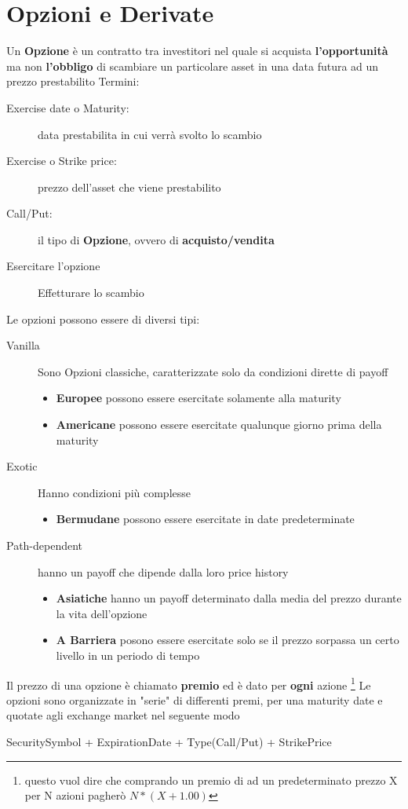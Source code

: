 \documentclass[a4paper,11pt]{report}
\begin{document}
{\section{Opzioni e Derivate}
	Un \textbf{Opzione} è un contratto tra investitori nel quale si acquista \textbf{l'opportunità} ma non \textbf{l'obbligo} 
	di scambiare un particolare asset in una data futura ad un prezzo prestabilito \newline
	Termini: 
\begin{description}
	\item[Exercise date o Maturity:] data prestabilita in cui verrà svolto lo scambio 
	\item[Exercise o Strike price:] prezzo dell'asset che viene prestabilito
	\item[Call/Put:] il tipo di \textbf{Opzione}, ovvero di \textbf{acquisto/vendita}
	\item[Esercitare l'opzione] Effetturare lo scambio
\end{description} 
	Le opzioni possono essere di diversi tipi:
\begin{description}
	\item[Vanilla] Sono Opzioni classiche, caratterizzate solo da condizioni dirette di payoff
		\begin{itemize}
			\item \textbf{Europee} possono essere esercitate solamente alla maturity
			\item \textbf{Americane} possono essere esercitate qualunque giorno prima della maturity
		\end{itemize}
	\item[Exotic] Hanno condizioni più complesse
		\begin{itemize}
			\item \textbf{Bermudane} possono essere esercitate in date predeterminate
		\end{itemize}
	\item[Path-dependent] hanno un payoff che dipende dalla loro price history
		\begin{itemize}
			\item \textbf{Asiatiche} hanno un payoff determinato dalla media del prezzo durante la vita dell'opzione
			\item \textbf{A Barriera} posono essere esercitate solo se il prezzo sorpassa un certo livello in un periodo di tempo
		\end{itemize}
\end{description}
	Il prezzo di una opzione è chiamato \textbf{premio} ed è dato per \textbf{ogni} azione
	 \footnote{questo vuol dire che comprando un premio di   ad un predeterminato prezzo X per N azioni pagherò $N*(X+1.00)$}
	\newline  Le opzioni sono organizzate in "serie" di differenti premi, per una maturity date e quotate agli exchange market nel 		seguente modo \newline
\begin{center}
	SecuritySymbol + ExpirationDate + Type(Call/Put) + StrikePrice
\end{center}
}
\end{document}
